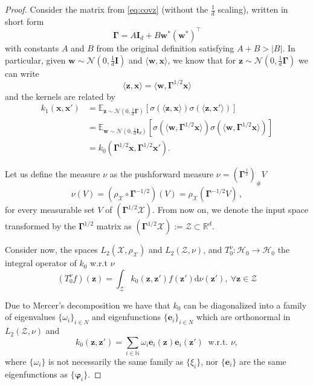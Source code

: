 \begin{proof}
    Consider the matrix from \cref{eq:covz} (without the $\frac{1}{d}$ scaling), written in short form
    \[
        \bm \Gamma  = A\bm I_d + B\bm w^* (\bm w^*)^\top
    \]
    with constants $A$ and $B$ from the original definition satisfying $A + B > |B|$. In particular, given $\bm w \sim \mathcal N\left(0, \frac{1}{d}\bm I\right)$ and $\langle \bm w, \bm x\rangle$, we know that for $\bm z \sim \mathcal N\left(0, \frac{1}{d}\bm \Gamma\right)$ we can write
    \[
        \langle \bm z, \bm x\rangle = \langle \bm w, \bm \Gamma^{1/2} \bm x \rangle
    \]
    and the kernels are related by
    \begin{align*}
        k_1(\bm x, \bm x') &= \mathbb E_{\bm z \sim \mathcal N\left(0, \frac{1}{d}\bm \Gamma\right)}[\sigma(\langle \bm z, \bm x\rangle)\sigma(\langle\bm z, \bm x'\rangle)] \\
        &= \mathbb E_{\bm w \sim \mathcal N\left(0, \frac{1}{d}\bm I_d\right)}[\sigma(\langle \bm w, \bm \Gamma^{1/2} \bm x \rangle)\sigma(\langle \bm w, \bm \Gamma^{1/2} \bm x \rangle)]\\
        &= k_0(\bm \Gamma^{1/2}\bm x, \bm \Gamma^{1/2}\bm x').
    \end{align*}
    
    Let us define the measure $\nu$ as the pushforward measure $\nu = (\bm \Gamma^{\frac{1}{2}})_{\#} V$
    \[
        \nu(V) = (\rho_{\mathcal X} \circ \bm \Gamma ^{-1/2})(V)= \rho_{\mathcal X} (\bm \Gamma^{-1/2}V)\, ,
    \]
    for every measurable set $V$ of $(\bm \Gamma ^{1/2} \mathcal X)$. From now on, we denote the input space transformed by the $\bm \Gamma^{1/2}$ matrix as $(\bm \Gamma^{1/2}\mathcal X) := \mathcal Z \subset \mathbb R^d.$
    
    Consider now, the spaces $L_2(\mathcal X, \rho_{\mathcal X})$ and $L_2(\mathcal Z, \nu)$, and $T_0^{\nu}:\mathcal H_0 \to \mathcal H_0$ the integral operator of $k_0$ w.r.t $\nu$
    \[
        (T_0^{\nu} f)(\bm z) = \int_{\mathcal Z } k_0(\bm z, \bm z')f(\bm z') \mathrm d\nu(\bm z'),\ \forall \bm z \in \mathcal Z
    \]
    
    Due to Mercer's decomposition we have that $k_0$ can be diagonalized into a family of eigenvalues $\{\omega_i\}_{i\in N}$ and eigenfunctions $\{\bm e_i\}_{i \in N}$ which are orthonormal in $L_2(\mathcal Z, \nu)$ and 
    \[
        k_0(\bm z, \bm z') = \sum_{i \in \mathbb N} \omega_i \bm e_i(\bm z) \bm e_i(\bm z') \ \text{ w.r.t. $\nu$},
    \]
    where $\{\omega_i\}$ is not necessarily the same family as $\{\xi_i\}$, nor $\{\bm e_i\}$ are the same eigenfunctions as $\{\bm \varphi_i\}$.
    

\end{proof}
